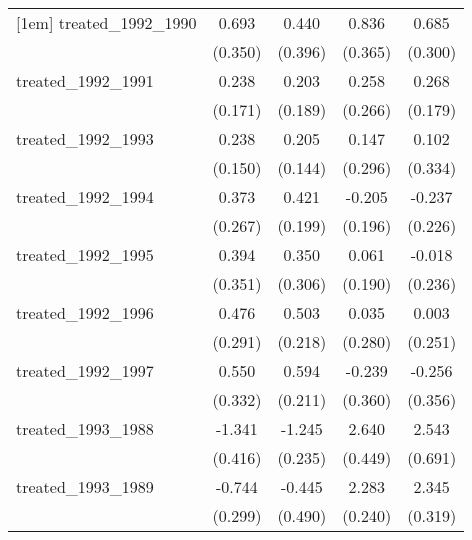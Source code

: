 {\begin{tabular}{l*{4}{c}}
[1em]
treated\_1992\_1990&       0.693\sym{*}  &       0.440         &       0.836\sym{*}  &       0.685\sym{*}  \\
            &     (0.350)         &     (0.396)         &     (0.365)         &     (0.300)         \\
[1em]
treated\_1992\_1991&       0.238         &       0.203         &       0.258         &       0.268         \\
            &     (0.171)         &     (0.189)         &     (0.266)         &     (0.179)         \\
[1em]
treated\_1992\_1993&       0.238         &       0.205         &       0.147         &       0.102         \\
            &     (0.150)         &     (0.144)         &     (0.296)         &     (0.334)         \\
[1em]
treated\_1992\_1994&       0.373         &       0.421\sym{*}  &      -0.205         &      -0.237         \\
            &     (0.267)         &     (0.199)         &     (0.196)         &     (0.226)         \\
[1em]
treated\_1992\_1995&       0.394         &       0.350         &       0.061         &      -0.018         \\
            &     (0.351)         &     (0.306)         &     (0.190)         &     (0.236)         \\
[1em]
treated\_1992\_1996&       0.476         &       0.503\sym{*}  &       0.035         &       0.003         \\
            &     (0.291)         &     (0.218)         &     (0.280)         &     (0.251)         \\
[1em]
treated\_1992\_1997&       0.550         &       0.594\sym{**} &      -0.239         &      -0.256         \\
            &     (0.332)         &     (0.211)         &     (0.360)         &     (0.356)         \\
[1em]
treated\_1993\_1988&      -1.341\sym{**} &      -1.245\sym{***}&       2.640\sym{***}&       2.543\sym{***}\\
            &     (0.416)         &     (0.235)         &     (0.449)         &     (0.691)         \\
[1em]
treated\_1993\_1989&      -0.744\sym{*}  &      -0.445         &       2.283\sym{***}&       2.345\sym{***}\\
            &     (0.299)         &     (0.490)         &     (0.240)         &     (0.319)         \\

\end{tabular}}
